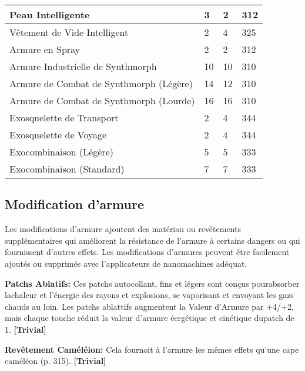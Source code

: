 \begin{table}
\begin{tabular}{|l|l|l|l|}
Peau Intelligente	&3	&2	&312	\\ \hline

Vêtement de Vide Intelligent	&2	&4	&325	\\ \hline

Armure en Spray	&2	&2	&312	\\ \hline

Armure Industrielle de Synthmorph	&10	&10	&310	\\ \hline

Armure de Combat de Synthmorph (Légère)	&14	&12	&310	\\ \hline

Armure de Combat de Synthmorph (Lourde)	&16	&16	&310	\\ \hline

Exosquelette de Transport	&2	&4	&344	\\ \hline

Exosquelette de Voyage	&2	&4	&344	\\ \hline

Exocombinaison (Légère)	&5	&5	&333	\\ \hline

Exocombinaison (Standard)	&7	&7	&333	\\ \hline

\end{tabular} \label{tab:armor-values} \end{table} 

\subsection{Modification d'armure} \label{sec:armor-mods} 

Les modifications d'armure ajoutent des matériau ou revêtements supplémentaires qui améliorent la résistance de l'armure à certains dangers ou qui fournissent d'autres effets. Les modifications d'armures peuvent être facilement ajoutés ou supprimés avec l'applicateurs de nanomachines adéquat. 

\textbf{Patchs Ablatifs:} Ces patchs autocollant, fins et légers sont conçus pourabsorber lachaleur et l'énergie des rayons et explosions, se vaporisant et envoyant les gazs chauds au loin. Les patchs ablattifs augmentent la Valeur d'Armure par +4/+2, mais chaque touche réduit la valeur d'armure éergétique et cinétique dupatch de 1. \textbf{[Trivial]} 

\textbf{Revêtement Caméléion:} Cela fournoit à l'armure les mêmes effets qu'une cape caméléon (p. 315). \textbf{[Trivial]} 

